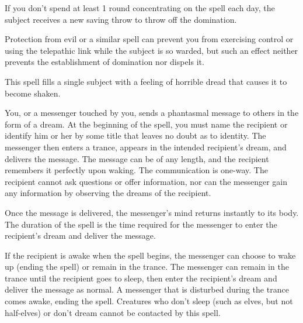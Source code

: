 \begin{multicols}{2}
\begin{small}
\smallskip\noindent If you don't spend at least 1 round concentrating on the spell each day, the subject receives a new saving throw to throw off the domination.

\smallskip\noindent Protection from evil or a similar spell can prevent you from exercising control or using the telepathic link while the subject is so warded, but such an effect neither prevents the establishment of domination nor dispels it.

\noindent This spell fills a single subject with a feeling of horrible dread that causes it to become shaken.

\noindent You, or a messenger touched by you, sends a phantasmal message to others in the form of a dream. At the beginning of the spell, you must name the recipient or identify him or her by some title that leaves no doubt as to identity. The messenger then enters a trance, appears in the intended recipient's dream, and delivers the message. The message can be of any length, and the recipient remembers it perfectly upon waking. The communication is one-way. The recipient cannot ask questions or offer information, nor can the messenger gain any information by observing the dreams of the recipient.

\smallskip\noindent Once the message is delivered, the messenger's mind returns instantly to its body. The duration of the spell is the time required for the messenger to enter the recipient's dream and deliver the message.

\smallskip\noindent If the recipient is awake when the spell begins, the messenger can choose to wake up (ending the spell) or remain in the trance. The messenger can remain in the trance until the recipient goes to sleep, then enter the recipient's dream and deliver the message as normal. A messenger that is disturbed during the trance comes awake, ending the spell.
Creatures who don't sleep (such as elves, but not half-elves) or don't dream cannot be contacted by this spell.


\end{small}
\end{multicols}
